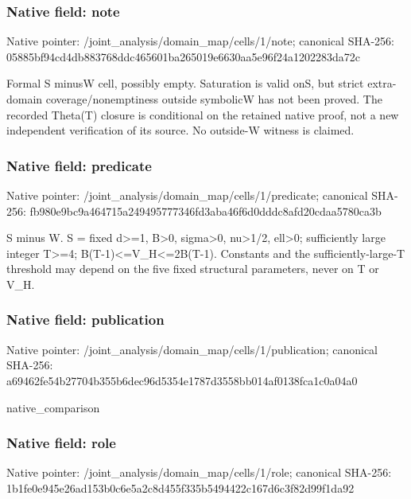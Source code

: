 \documentclass[10pt,a4paper]{article}
\begin{document}
\subsubsection{Native field: note}
Native pointer: /joint\_\allowbreak{}analysis/domain\_\allowbreak{}map/cells/1/note; canonical SHA-256: 05885bf94cd4db883768ddc465601ba265019e6630aa5e96f24a1202283da72c

\begingroup\raggedright\sloppy Formal S minusW cell,\allowbreak{} possibly empty. Saturation is valid onS,\allowbreak{} but strict extra-domain coverage/\allowbreak{}nonemptiness outside symbolicW has not been proved. The recorded Theta(T) closure is conditional on the retained native proof,\allowbreak{} not a new independent verification of its source. No outside-W witness is claimed.\par\endgroup

\subsubsection{Native field: predicate}
Native pointer: /joint\_\allowbreak{}analysis/domain\_\allowbreak{}map/cells/1/predicate; canonical SHA-256: fb980e9bc9a464715a249495777346fd3aba46f6d0dddc8afd20cdaa5780ca3b

\begingroup\raggedright\sloppy S minus W. S =\allowbreak{} fixed d>=\allowbreak{}1,\allowbreak{} B>0,\allowbreak{} sigma>0,\allowbreak{} nu>1/\allowbreak{}2,\allowbreak{} ell>0;\allowbreak{} sufficiently large integer T>=\allowbreak{}4;\allowbreak{} B(T-1)<=\allowbreak{}V\_\allowbreak{}H<=\allowbreak{}2B(T-1). Constants and the sufficiently-large-T threshold may depend on the five fixed structural parameters,\allowbreak{} never on T or V\_\allowbreak{}H.\par\endgroup

\subsubsection{Native field: publication}
Native pointer: /joint\_\allowbreak{}analysis/domain\_\allowbreak{}map/cells/1/publication; canonical SHA-256: a69462fe54b27704b355b6dec96d5354e1787d3558bb014af0138fca1c0a04a0

\begingroup\raggedright\sloppy native\_\allowbreak{}comparison\par\endgroup

\subsubsection{Native field: role}
Native pointer: /joint\_\allowbreak{}analysis/domain\_\allowbreak{}map/cells/1/role; canonical SHA-256: 1b1fe0e945e26ad153b0c6e5a2c8d455f335b5494422c167d6c3f82d99f1da92
\end{document}
